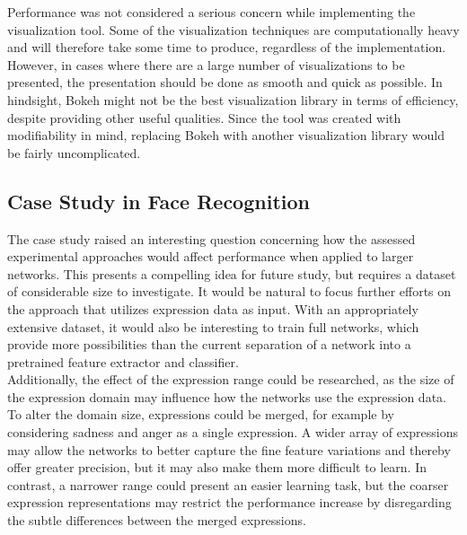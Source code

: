 \noindent Performance was not considered a serious concern while implementing the visualization tool. Some of the visualization techniques are computationally heavy and will therefore take some time to produce, regardless of the implementation. However, in cases where there are a large number of visualizations to be presented, the presentation should be done as smooth and quick as possible. In hindsight, Bokeh might not be the best visualization library in terms of efficiency, despite providing other useful qualities. Since the tool was created with modifiability in mind, replacing Bokeh with another visualization library would be fairly uncomplicated. 

\begin{comment}
- Performance and efficiency
- Prediction
- Generalize even more
- More metrics
- Show architecture
- Several input images
- More comparison
- Better presentation of visualizations
\end{comment}

\subsection{Case Study in Face Recognition}

The case study raised an interesting question concerning how the assessed experimental approaches would affect performance when applied to larger networks. This presents a compelling idea for future study, but requires a dataset of considerable size to investigate. It would be natural to focus further efforts on the approach that utilizes expression data as input. With an appropriately extensive dataset, it would also be interesting to train full networks, which provide more possibilities than the current separation of a network into a pretrained feature extractor and classifier. \\

\noindent Additionally, the effect of the expression range could be researched, as the size of the expression domain may influence how the networks use the expression data. To alter the domain size, expressions could be merged, for example by considering sadness and anger as a single expression. A wider array of expressions may allow the networks to better capture the fine feature variations and thereby offer greater precision, but it may also make them more difficult to learn. In contrast, a narrower range could present an easier learning task, but the coarser expression representations may restrict the performance increase by disregarding the subtle differences between the merged expressions.


\cleardoublepage